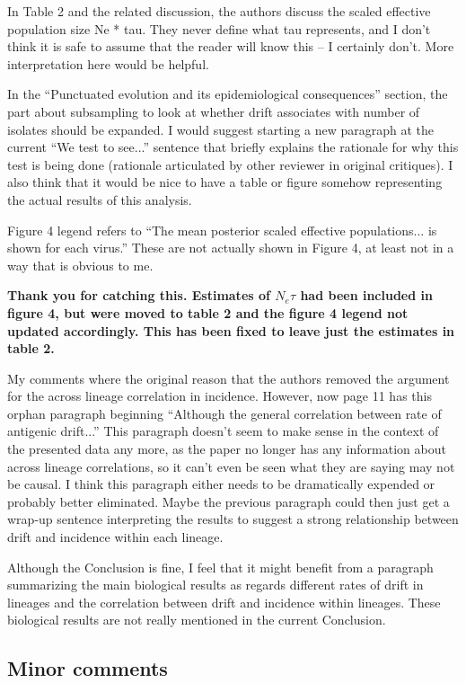 \documentclass[11pt,oneside,letterpaper]{article}
\begin{document}
In Table 2 and the related discussion, the authors discuss the scaled effective population size Ne * tau. They never define what tau represents, and I don't think it is safe to assume that the reader will know this -- I certainly don't. More interpretation here would be helpful. 

In the ``Punctuated evolution and its epidemiological consequences'' section, the part about subsampling to look at whether drift associates with number of isolates should be expanded. I would suggest starting a new paragraph at the current ``We test to see...'' sentence that briefly explains the rationale for why this test is being done (rationale articulated by other reviewer in original critiques). I also think that it would be nice to have a table or figure somehow representing the actual results of this analysis. 

Figure 4 legend refers to ``The mean posterior scaled effective populations... is shown for each virus.'' These are not actually shown in Figure 4, at least not in a way that is obvious to me. 

\textbf{Thank you for catching this.  Estimates of $N_e\tau$ had been included in figure 4, but were moved to table 2 and the figure 4 legend not updated accordingly.  This has been fixed to leave just the estimates in table 2.}

My comments where the original reason that the authors removed the argument for the across lineage correlation in incidence. However, now page 11 has this orphan paragraph beginning ``Although the general correlation between rate of antigenic drift...'' This paragraph doesn't seem to make sense in the context of the presented data any more, as the paper no longer has any information about across lineage correlations, so it can't even be seen what they are saying may not be causal. I think this paragraph either needs to be dramatically expended or probably better eliminated. Maybe the previous paragraph could then just get a wrap-up sentence interpreting the results to suggest a strong relationship between drift and incidence within each lineage. 

Although the Conclusion is fine, I feel that it might benefit from a paragraph summarizing the main biological results as regards different rates of drift in lineages and the correlation between drift and incidence within lineages. These biological results are not really mentioned in the current Conclusion. 

\subsection*{Minor comments}
\end{document}
